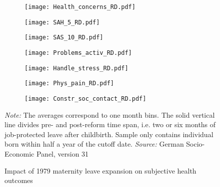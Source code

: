 \documentclass[a4paper ]{article}
\begin{document}
\begin{figure}[p]
\begin{subfigure}[h]{0.48\textwidth}\centering
	\texttt{[image: Health\_concerns\_RD.pdf]}
\end{subfigure}
\quad
\begin{subfigure}[h]{0.48\textwidth}\centering
	\texttt{[image: SAH\_5\_RD.pdf]}
\end{subfigure}

\begin{subfigure}[h]{0.48\textwidth}\centering
	\texttt{[image: SAS\_10\_RD.pdf]}
\end{subfigure}
\quad
\begin{subfigure}[h]{0.48\textwidth}\centering
	\texttt{[image: Problems\_activ\_RD.pdf]}
\end{subfigure}



\begin{subfigure}[h]{0.48\textwidth}\centering
	\texttt{[image: Handle\_stress\_RD.pdf]}
\end{subfigure}
\quad
\begin{subfigure}[h]{0.48\textwidth}\centering
	\texttt{[image: Phys\_pain\_RD.pdf]}
\end{subfigure}

\begin{subfigure}[h]{0.48\textwidth}\centering
	\texttt{[image: Constr\_soc\_contact\_RD.pdf]}
\end{subfigure}


\caption{Impact of 1979 maternity leave expansion on subjective health outcomes}\label{fig: RD_SH}
\begin{minipage}{\textwidth} %
{\footnotesize \textit{Note:} The averages correspond to one month bins. The solid vertical line divides pre- and post-reform time span, i.e. two or six months of job-protected leave after childbirth. Sample only contains individual born within half a year of the cutoff date. \newline \textit{Source: }German Socio-Economic Panel, version 31\par}
\end{minipage}
\end{figure}
\end{document}

